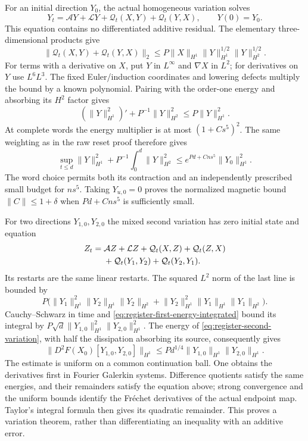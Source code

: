 \documentclass[11pt,a4paper]{amsart}
\theoremstyle{definition}
\theoremstyle{remark}
\numberwithin{equation}{section}
\newcommand{\norm}[1]{\lVert #1\rVert}
\begin{document}
For an initial direction $Y_0$, the actual homogeneous variation solves
\begin{equation}\label{eq:register-first-variation}
 Y_t=\mathcal AY+\mathcal LY+
          \mathcal Q_t(X,Y)+\mathcal Q_t(Y,X),\qquad Y(0)=Y_0.
\end{equation}
This equation contains no differentiated additive residual.  The elementary
three-dimensional products give
\[
 \norm{\mathcal Q_t(X,Y)+\mathcal Q_t(Y,X)}_2
 \le P\norm X_{H^1}\norm Y_{H^1}^{1/2}\norm Y_{H^2}^{1/2}.
\]
For terms with a derivative on $X$, put $Y$ in $L^\infty$ and $\nabla X$
in $L^2$; for derivatives on $Y$ use $L^6L^3$.  The fixed Euler/induction
coordinates and lowering defects multiply the bound by a known polynomial.
Pairing with the order-one energy and absorbing its $H^2$ factor gives
\begin{equation}\label{eq:register-first-energy}
 (\norm Y_{H^1}^2)'+P^{-1}\norm Y_{H^2}^2
                  \le P\norm Y_{H^1}^2.
\end{equation}
At complete words the energy multiplier is at most $(1+Cs^5)^2$.
The same weighting as in the raw reset proof therefore gives
\begin{equation}\label{eq:register-first-energy-integrated}
 \sup_{t\le d}\norm Y_{H^1}^2+
       P^{-1}\int_0^d\norm Y_{H^2}^2
 \le e^{Pd+Cns^5}\norm{Y_0}_{H^1}^2.
\end{equation}
The word choice permits both its contraction and an independently prescribed
small budget for $ns^5$.  Taking $Y_{u,0}=0$ proves the normalized magnetic
bound $\norm C\le1+\delta$ when $Pd+Cns^5$ is sufficiently small.

For two directions $Y_{1,0},Y_{2,0}$ the mixed second variation has zero
initial state and equation
\begin{align}\label{eq:register-second-variation}
 Z_t={}&\mathcal AZ+\mathcal LZ+
       \mathcal Q_t(X,Z)+\mathcal Q_t(Z,X)\notag\\
       &+\mathcal Q_t(Y_1,Y_2)+\mathcal Q_t(Y_2,Y_1).
\end{align}
Its restarts are the same linear restarts.  The squared $L^2$ norm of the
last line is bounded by
\[
 P\bigl(\norm{Y_1}_{H^1}^2\norm{Y_2}_{H^1}\norm{Y_2}_{H^2}
       +\norm{Y_2}_{H^1}^2\norm{Y_1}_{H^1}\norm{Y_1}_{H^2}\bigr).
\]
Cauchy--Schwarz in time and
\eqref{eq:register-first-energy-integrated} bound its integral by
$P\sqrt d\norm{Y_{1,0}}_{H^1}^2\norm{Y_{2,0}}_{H^1}^2$.
The energy of \eqref{eq:register-second-variation}, with half the dissipation
absorbing its source, consequently gives
\begin{equation}\label{eq:register-second-energy}
 \norm{D^2F(X_0)[Y_{1,0},Y_{2,0}]}_{H^1}
 \le Pd^{1/4}\norm{Y_{1,0}}_{H^1}\norm{Y_{2,0}}_{H^1}.
\end{equation}
The estimate is uniform on a common continuation ball.  One obtains the
derivatives first in Fourier Galerkin systems.  Difference quotients satisfy
the same energies, and their remainders satisfy the equation above; strong
convergence and the uniform bounds identify the Fr\'echet derivatives of
the actual endpoint map.  Taylor's integral formula then gives its quadratic
remainder.  This proves a variation theorem, rather than differentiating an
inequality with an additive error.
\end{document}
